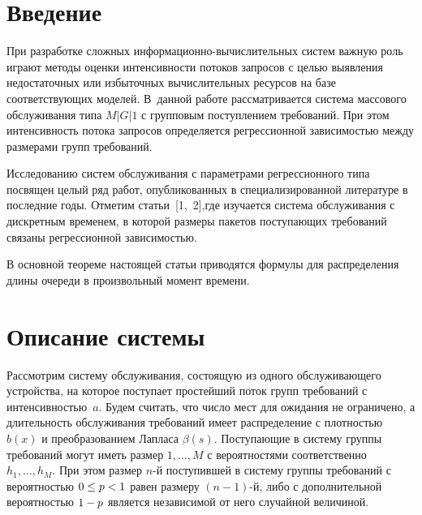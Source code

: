


\thispagestyle{headings}

\begin{multicols}{2}

\label{st\stat}

\section{Введение}

При разработке сложных ин\-фор\-ма\-ци\-он\-но-вы\-чис\-ли\-тель\-ных сис\-тем важную
роль играют методы оценки интенсивности потоков запросов с целью
выявления недостаточных или избыточных вы\-чис\-ли\-тель\-ных ресурсов на
базе соответствующих моделей. В~данной работе рассматривается
система массового обслуживания типа $M|G|1$ с групповым поступлением
требований. При этом интенсивность потока запросов определяется
регрессионной зависимостью между размерами групп тре\-бо\-ваний.
{

}

Исследованию систем обслуживания с па\-ра\-мет\-ра\-ми регрессионного типа
посвящен целый ряд работ, опубликованных в специализированной
литературе в последние годы. Отметим статьи~[1,~2],\linebreak где изучается
система обслуживания с дискретным временем, в которой размеры
пакетов по\-сту\-па\-ющих требований связаны регрессионной за\-ви\-си\-мостью.

В основной теореме настоящей статьи приводятся формулы
для распределения длины очереди в произвольный момент времени.

\section{Описание системы}

Рассмотрим систему обслуживания, состоящую из одного обслуживающего
устройства, на которое поступает простейший поток групп требований с
интенсивностью~$a$. Будем считать, что число мест для ожидания не
ограничено, а длительность обслуживания требований имеет
распределение с плотностью $b(x)$ и преобразованием Лапласа
$\beta(s)$. Поступающие в систему группы требований могут иметь
размер $1,\ldots,M$ с вероятностями соответственно $h_1,\ldots,h_M$.
При этом размер $n$-й поступившей в систему группы требований с
вероятностью $0\hm\leq p\hm<1$ равен размеру $(n-1)$-й, либо с
дополнительной вероятностью $1\hm-p$ является независимой от него
случайной величиной.


\end{multicols}

